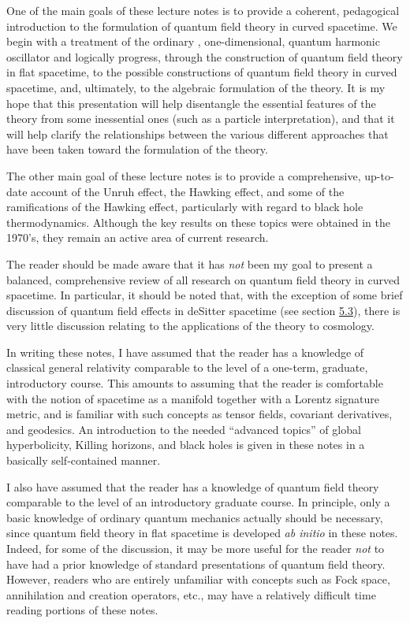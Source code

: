 \documentclass[11pt,a4paper]{article}
\begin{document}
One of the main goals of these lecture notes is to provide a coherent, pedagogical introduction to the formulation of quantum field theory in curved spacetime. We begin with a treatment of the ordinary \hypertarget{source-9}{}, one-dimensional, quantum harmonic oscillator and logically progress, through the construction of quantum field theory in flat spacetime, to the possible constructions of quantum field theory in curved spacetime, and, ultimately, to the algebraic formulation of the theory. It is my hope that this presentation will help disentangle the essential features of the theory from some inessential ones (such as a particle interpretation), and that it will help clarify the relationships between the various different approaches that have been taken toward the formulation of the theory.

The other main goal of these lecture notes is to provide a comprehensive, up-to-date account of the Unruh effect, the Hawking effect, and some of the ramifications of the Hawking effect, particularly with regard to black hole thermodynamics. Although the key results on these topics were obtained in the 1970's, they remain an active area of current research.

The reader should be made aware that it has \emph{not} been my goal to present a balanced, comprehensive review of all research on quantum field theory in curved spacetime. In particular, it should be noted that, with the exception of some brief discussion of quantum field effects in deSitter spacetime (see section \hyperlink{sec:5.3}{5.3}), there is very little discussion relating to the applications of the theory to cosmology.

In writing these notes, I have assumed that the reader has a knowledge of classical general relativity comparable to the level of a one-term, graduate, introductory course. This amounts to assuming that the reader is comfortable with the notion of spacetime as a manifold together with a Lorentz signature metric, and is familiar with such concepts as tensor fields, covariant derivatives, and geodesics. An introduction to the needed ``advanced topics'' of global hyperbolicity, Killing horizons, and black holes is given in these notes in a basically self-contained manner.

I also have assumed that the reader has a knowledge of quantum field theory comparable to the level of an introductory graduate course. In principle, only a basic knowledge of ordinary quantum mechanics actually should be necessary, since quantum field theory in flat spacetime is developed \emph{ab initio} in these notes. Indeed, for some of the discussion, it may be more useful for the reader \emph{not} to have had a prior knowledge of standard presentations of quantum field theory. However, readers who are entirely unfamiliar with concepts \hypertarget{source-10}{} such as Fock space, annihilation and creation operators, etc., may have a relatively difficult time reading portions of these notes.
\end{document}
